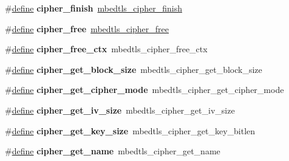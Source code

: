 \begin{DoxyCompactItemize}
\item 
\mbox{\label{compat-1_83_8h_ae1311926624bb23225b2bfb0357cdd67}} 
\#\hyperlink{structdefine}{define} {\bfseries cipher\+\_\+finish}~\hyperlink{cipher_8h_a6678691c02cb3f1322b2179987bfffb2}{mbedtls\+\_\+cipher\+\_\+finish}
\item 
\mbox{\label{compat-1_83_8h_ad91395cedf4f7c01a593333e4bee0c4d}} 
\#\hyperlink{structdefine}{define} {\bfseries cipher\+\_\+free}~\hyperlink{cipher_8h_a903c4146b471207690988584b83854a9}{mbedtls\+\_\+cipher\+\_\+free}
\item 
\mbox{\label{compat-1_83_8h_a9d66d119ef6ee7364582deceeebf198c}} 
\#\hyperlink{structdefine}{define} {\bfseries cipher\+\_\+free\+\_\+ctx}~mbedtls\+\_\+cipher\+\_\+free\+\_\+ctx
\item 
\mbox{\label{compat-1_83_8h_ace2d28c663917b73b6da92bc4f3afb3a}} 
\#\hyperlink{structdefine}{define} {\bfseries cipher\+\_\+get\+\_\+block\+\_\+size}~mbedtls\+\_\+cipher\+\_\+get\+\_\+block\+\_\+size
\item 
\mbox{\label{compat-1_83_8h_aa1afd9b3d48649b6fd0d674355878149}} 
\#\hyperlink{structdefine}{define} {\bfseries cipher\+\_\+get\+\_\+cipher\+\_\+mode}~mbedtls\+\_\+cipher\+\_\+get\+\_\+cipher\+\_\+mode
\item 
\mbox{\label{compat-1_83_8h_af3878046b721b580a9b2c01bcb0b50b1}} 
\#\hyperlink{structdefine}{define} {\bfseries cipher\+\_\+get\+\_\+iv\+\_\+size}~mbedtls\+\_\+cipher\+\_\+get\+\_\+iv\+\_\+size
\item 
\mbox{\label{compat-1_83_8h_a738c49e3c57c0661f2b6f58bebbb330a}} 
\#\hyperlink{structdefine}{define} {\bfseries cipher\+\_\+get\+\_\+key\+\_\+size}~mbedtls\+\_\+cipher\+\_\+get\+\_\+key\+\_\+bitlen
\item 
\mbox{\label{compat-1_83_8h_a98571f089b143b76f31fb77a12703647}} 
\#\hyperlink{structdefine}{define} {\bfseries cipher\+\_\+get\+\_\+name}~mbedtls\+\_\+cipher\+\_\+get\+\_\+name
\item 
\mbox{\label{compat-1_83_8h_aaa6dd7f2c66c65b00095e416fa98d982}} 

\end{DoxyCompactItemize}
